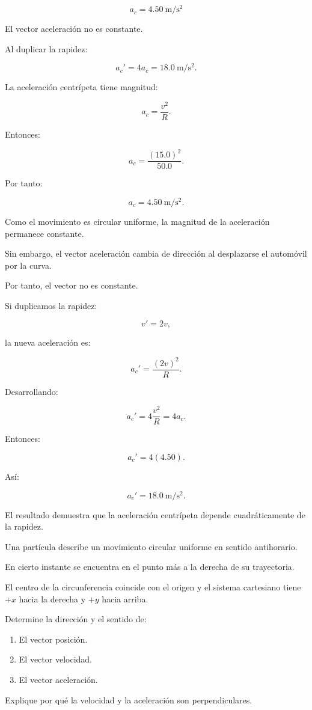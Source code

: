 \begin{respuesta}
\[
\boxed{a_c=\SI{4.50}{\meter\per\second\squared}}
\]

El vector aceleración no es constante.

Al duplicar la rapidez:

\[
\boxed{a_c'=4a_c=\SI{18.0}{\meter\per\second\squared}}.
\]
\end{respuesta}

\begin{explicacion}
La aceleración centrípeta tiene magnitud:

\[
a_c=\frac{v^2}{R}.
\]

Entonces:

\[
a_c=\frac{(15.0)^2}{50.0}.
\]

Por tanto:

\[
\boxed{a_c=\SI{4.50}{\meter\per\second\squared}}.
\]

Como el movimiento es circular uniforme, la magnitud de la
aceleración permanece constante.

Sin embargo, el vector aceleración cambia de dirección al
desplazarse el automóvil por la curva.

Por tanto, el vector no es constante.

Si duplicamos la rapidez:

\[
v'=2v,
\]

la nueva aceleración es:

\[
a_c'=\frac{(2v)^2}{R}.
\]

Desarrollando:

\[
a_c'=4\frac{v^2}{R}=4a_c.
\]

Entonces:

\[
a_c'=4(4.50).
\]

Así:

\[
\boxed{a_c'=\SI{18.0}{\meter\per\second\squared}}.
\]

El resultado demuestra que la aceleración centrípeta depende
cuadráticamente de la rapidez.
\end{explicacion}


\begin{ejercicio}
Una partícula describe un movimiento circular uniforme en sentido
antihorario.

En cierto instante se encuentra en el punto más a la derecha
de su trayectoria.

El centro de la circunferencia coincide con el origen y el
sistema cartesiano tiene \(+x\) hacia la derecha y \(+y\)
hacia arriba.

Determine la dirección y el sentido de:

\begin{enumerate}[label=\alph*)]
    \item El vector posición.
    \item El vector velocidad.
    \item El vector aceleración.
\end{enumerate}

Explique por qué la velocidad y la aceleración son perpendiculares.
\end{ejercicio}

